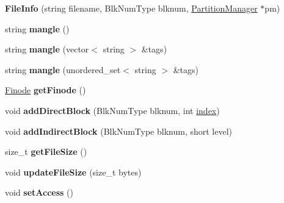 \begin{DoxyCompactItemize}
\item 
\mbox{\label{classFileInfo_a3586bb4f50c4a0f63ff4ea0a1e56ce9c}} 
{\bfseries File\+Info} (string filename, Blk\+Num\+Type blknum, \mbox{\hyperlink{classPartitionManager}{Partition\+Manager}} $\ast$pm)
\item 
\mbox{\label{classFileInfo_a96827c2e48fb1a15d468e9afd545383e}} 
string {\bfseries mangle} ()
\item 
\mbox{\label{classFileInfo_a105ad751f21bead6fc2a76e79cb3b701}} 
string {\bfseries mangle} (vector$<$ string $>$ \&tags)
\item 
\mbox{\label{classFileInfo_aec8a60addbed54097f6cac0a6a516717}} 
string {\bfseries mangle} (unordered\+\_\+set$<$ string $>$ \&tags)
\item 
\mbox{\label{classFileInfo_a80777be7ba01a63cca90c8d9062c49b3}} 
\mbox{\hyperlink{structfinode}{Finode}} {\bfseries get\+Finode} ()
\item 
\mbox{\label{classFileInfo_a83e728ab41847e3b0d4eee9c98b89965}} 
void {\bfseries add\+Direct\+Block} (Blk\+Num\+Type blknum, int \mbox{\hyperlink{structindex}{index}})
\item 
\mbox{\label{classFileInfo_a59e56b96bc289112ed0f967c7cd60ed9}} 
void {\bfseries add\+Indirect\+Block} (Blk\+Num\+Type blknum, short level)
\item 
\mbox{\label{classFileInfo_a7c33e236c627e7a4557207e9831342eb}} 
size\+\_\+t {\bfseries get\+File\+Size} ()
\item 
\mbox{\label{classFileInfo_ae0389f01dbb6b4d365d1d062a9f5b146}} 
void {\bfseries update\+File\+Size} (size\+\_\+t bytes)
\item 
\mbox{\label{classFileInfo_aba223845c8a1e7091626e6d241e5f069}} 
void {\bfseries set\+Access} ()
\item 
\mbox{\label{classFileInfo_a911b6fe0c76dbeb57613f447106b4d6a}} 

\end{DoxyCompactItemize}
